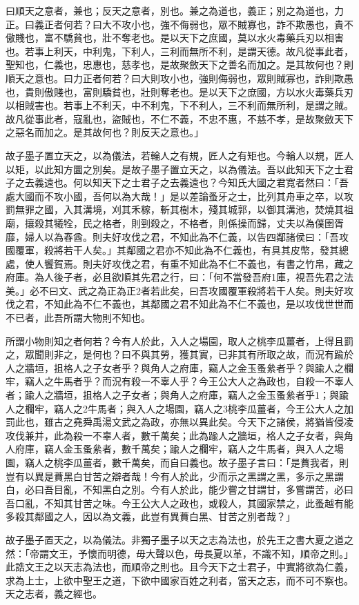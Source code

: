 \begin{pinyinscope}
曰順天之意者，兼也；反天之意者，別也。兼之為道也，義正；別之為道也，力正。曰義正者何若？曰大不攻小也，強不侮弱也，眾不賊寡也，詐不欺愚也，貴不傲賤也，富不驕貧也，壯不奪老也。是以天下之庶國，莫以水火毒藥兵刃以相害也。若事上利天，中利鬼，下利人，三利而無所不利，是謂天德。故凡從事此者，聖知也，仁義也，忠惠也，慈孝也，是故聚斂天下之善名而加之。是其故何也？則順天之意也。曰力正者何若？曰大則攻小也，強則侮弱也，眾則賊寡也，詐則欺愚也，貴則傲賤也，富則驕貧也，壯則奪老也。是以天下之庶國，方以水火毒藥兵刃以相賊害也。若事上不利天，中不利鬼，下不利人，三不利而無所利，是謂之賊。故凡從事此者，寇亂也，盜賊也，不仁不義，不忠不惠，不慈不孝，是故聚斂天下之惡名而加之。是其故何也？則反天之意也。」

故子墨子置立天之，以為儀法，若輪人之有規，匠人之有矩也。今輪人以規，匠人以矩，以此知方圜之別矣。是故子墨子置立天之，以為儀法。吾以此知天下之士君子之去義遠也。何以知天下之士君子之去義遠也？今知氏大國之君寬者然曰：「吾處大國而不攻小國，吾何以為大哉！」是以差論蚤牙之士，比列其舟車之卒，以攻罰無罪之國，入其溝境，刈其禾稼，斬其樹木，殘其城郭，以御其溝池，焚燒其祖廟，攘殺其犧牷，民之格者，則剄殺之，不格者，則係操而歸，丈夫以為僕圉胥靡，婦人以為舂酋。則夫好攻伐之君，不知此為不仁義，以告四鄰諸侯曰：「吾攻國覆軍，殺將若干人矣。」其鄰國之君亦不知此為不仁義也，有具其皮幣，發其總處，使人饗賀焉。則夫好攻伐之君，有重不知此為不仁不義也，有書之竹帛，藏之府庫。為人後子者，必且欲順其先君之行，曰：「何不當發吾府1庫，視吾先君之法美。」必不曰文、武之為正為正2者若此矣，曰吾攻國覆軍殺將若干人矣。則夫好攻伐之君，不知此為不仁不義也，其鄰國之君不知此為不仁不義也，是以攻伐世世而不已者，此吾所謂大物則不知也。

所謂小物則知之者何若？今有人於此，入人之場園，取人之桃李瓜薑者，上得且罰之，眾聞則非之，是何也？曰不與其勞，獲其實，已非其有所取之故，而況有踰於人之牆垣，抯格人之子女者乎？與角人之府庫，竊人之金玉蚤絫者乎？與踰人之欄牢，竊人之牛馬者乎？而況有殺一不辜人乎？今王公大人之為政也，自殺一不辜人者；踰人之牆垣，抯格人之子女者；與角人之府庫，竊人之金玉蚤絫者乎1；與踰人之欄牢，竊人之2牛馬者；與入人之場園，竊人之3桃李瓜薑者，今王公大人之加罰此也，雖古之堯舜禹湯文武之為政，亦無以異此矣。今天下之諸侯，將猶皆侵凌攻伐兼并，此為殺一不辜人者，數千萬矣；此為踰人之牆垣，格人之子女者，與角人府庫，竊人金玉蚤絫者，數千萬矣；踰人之欄牢，竊人之牛馬者，與入人之場園，竊人之桃李瓜薑者，數千萬矣，而自曰義也。故子墨子言曰：「是蕡我者，則豈有以異是蕡黑白甘苦之辯者哉！今有人於此，少而示之黑謂之黑，多示之黑謂白，必曰吾目亂，不知黑白之別。今有人於此，能少嘗之甘謂甘，多嘗謂苦，必曰吾口亂，不知其甘苦之味。今王公大人之政也，或殺人，其國家禁之，此蚤越有能多殺其鄰國之人，因以為文義，此豈有異蕡白黑、甘苦之別者哉？」

故子墨子置天之，以為儀法。非獨子墨子以天之志為法也，於先王之書大夏之道之然：「帝謂文王，予懷而明德，毋大聲以色，毋長夏以革，不識不知，順帝之則。」此誥文王之以天志為法也，而順帝之則也。且今天下之士君子，中實將欲為仁義，求為上士，上欲中聖王之道，下欲中國家百姓之利者，當天之志，而不可不察也。天之志者，義之經也。


\end{pinyinscope}